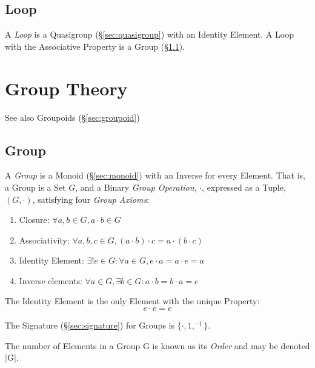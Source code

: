 \subsection{Loop}\label{sec:quasigroup_loop}

A \emph{Loop} is a Quasigroup (\S\ref{sec:quasigroup}) with an
Identity Element. A Loop with the Associative Property is a Group
(\S\ref{sec:group}).



\section{Group Theory}\label{sec:group_theory}

\fist See also Groupoids (\S\ref{sec:groupoid})



\subsection{Group}\label{sec:group}

A \emph{Group} is a Monoid (\S\ref{sec:monoid}) with an Inverse for
every Element. That is, a Group is a Set $G$, and a Binary \emph{Group
  Operation}, $\cdot$, expressed as a Tuple, $(G,\cdot)$, satisfying
four \emph{Group Axioms}:
\begin{enumerate}
    \item Closure: $\forall a,b \in G, a \cdot b \in G$
    \item Associativity: $\forall a,b,c \in G, (a \cdot b) \cdot c = a
      \cdot (b \cdot c)$
    \item Identity Element: $\exists! e \in G : \forall a \in G,
      e \cdot a = a \cdot e = a$
    \item Inverse elements: $\forall a \in G, \exists b \in G :
      a \cdot b = b \cdot a = e$
\end{enumerate}
The Identity Element is the only Element with the unique Property:
\[
    e \cdot e = e
\]

The Signature (\S\ref{sec:signature}) for Groups is $\{\cdot, 1,
^{-1}\}$.

The number of Elements in a Group $\mathrm{G}$ is known as its
\emph{Order} and may be denoted $|\mathrm{G}|$.

